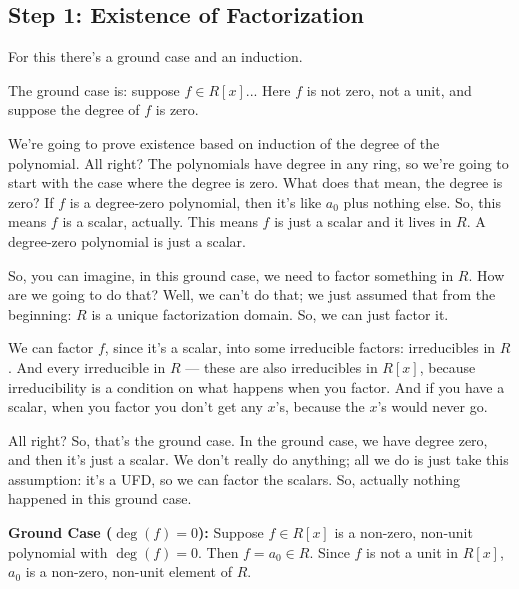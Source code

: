 \begin{proofWrapper}

\subsection{Step 1: Existence of Factorization}

\begin{speech}[00:21:44 - 00:23:58]
For this there's a ground case and an induction.

The ground case is: suppose $f \in R[x]$...  Here $f$ is not zero, not a unit, and suppose the degree of $f$ is zero. 

We're going to prove existence based on induction of the degree of the polynomial. All right? The polynomials have degree in any ring, so we're going to start with the case where the degree is zero. What does that mean, the degree is zero? If $f$ is a degree-zero polynomial, then it's like $a_0$ plus nothing else. So, this means $f$ is a scalar, actually. This means $f$ is just a scalar and it lives in $R$.  A degree-zero polynomial is just a scalar.

So, you can imagine, in this ground case, we need to factor something in $R$. How are we going to do that? Well, we can't do that; we just assumed that from the beginning: $R$ is a unique factorization domain. So, we can just factor it.

We can factor $f$, since it's a scalar, into some irreducible factors:  irreducibles in $R$. And every irreducible in $R$ --- these are also irreducibles in $R[x]$,  because irreducibility is a condition on what happens when you factor. And if you have a scalar, when you factor you don't get any $x$'s, because the $x$'s would never go.

All right? So, that's the ground case. In the ground case, we have degree zero, and then it's just a scalar. We don't really do anything; all we do is just take this assumption: it's a UFD, so we can factor the scalars. So, actually nothing happened in this ground case.
\end{speech}

\begin{content}[{Existence: Ground Case \texorpdfstring{($\deg(f) = 0$)}{(deg(f) = 0)}}]
\textbf{Ground Case ($\deg(f) = 0$):}
Suppose $f \in R[x]$ is a non-zero, non-unit polynomial with $\deg(f) = 0$.
Then $f = a_0 \in R$. Since $f$ is not a unit in $R[x]$, $a_0$ is a non-zero, non-unit element of $R$.


\end{content}
\end{proofWrapper}
